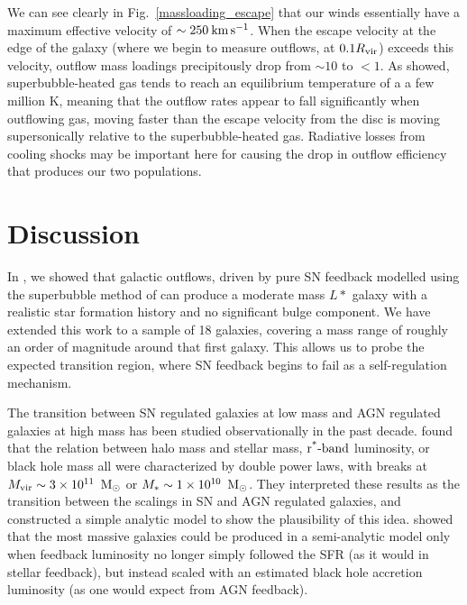We can see clearly in Fig.~\ref{massloading_escape} that our winds essentially
have a maximum effective velocity of $\sim250\>{\rm km}\,{\rm s}^{-1}$.  When the escape velocity
at the edge of the galaxy (where we begin to measure outflows, at $0.1R_{\rm vir}$)
exceeds this velocity, outflow mass loadings precipitously drop from $\sim10$ to
$<1$.  As \citet{Keller2014} showed, superbubble-heated gas tends to reach an
equilibrium temperature of a a few million K, meaning that the
outflow rates appear to fall significantly when outflowing gas, moving faster
than the escape velocity from the disc is moving supersonically relative to the
superbubble-heated gas.  Radiative losses from cooling shocks may be important
here for causing the drop in outflow efficiency that produces our two
populations.


\section{Discussion}
In \citet{Keller2015}, we showed that galactic outflows, driven by
pure SN feedback modelled using the superbubble method of \citet{Keller2014} can
produce a moderate mass  $L*$ galaxy with a realistic star formation history and
no significant bulge component.  We have extended this work to a sample
of 18 galaxies, covering a mass range of roughly an order of magnitude around
that first galaxy.  This allows us to probe the expected transition
region, where SN feedback begins to fail as a self-regulation mechanism.

The transition between SN regulated galaxies at low mass and AGN regulated galaxies
at high mass has been studied observationally in the past decade.  \citet{Shankar2006}
found that the relation between halo mass and stellar mass,
$\operatorname{r^*-\rm{band}}$
luminosity, or black hole mass all were characterized by double power laws, with
breaks at $M_{\rm vir}\sim3\times10^{11}\;\>{\rm M_{\odot}}$ or $M_*\sim1\times10^{10}\;\>{\rm M_{\odot}}$.
They interpreted these results as the transition between the scalings in SN and
AGN regulated galaxies, and constructed a simple analytic model to show the
plausibility of this idea.  \citet{Croton2006} showed that the most massive
galaxies could be produced in a semi-analytic model only when feedback
luminosity no longer simply followed the SFR (as it would in
stellar feedback), but instead scaled with an estimated black hole accretion
luminosity (as one would expect from AGN feedback).  

